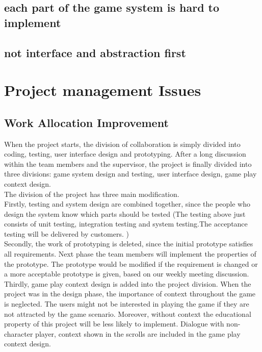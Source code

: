 \documentclass[12pt, a4paper]{report}
\begin{document}
		\subsection {each part of the game system is hard to implement}
		\subsection {not interface and abstraction first}

	\section{Project management Issues}
		\subsection{Work Allocation Improvement}
		When the project starts, the division of collaboration is simply divided into coding, testing, user interface design and prototyping. After a long discussion within the team members and the supervisor, the project is finally divided into three divisions: game system design and testing, user interface design, game play context design. \\


		The division of the project has three main modification.\\

		Firstly, testing and system design are combined together, since the people who design the system know which parts should be tested (The testing above just consists of unit testing, integration testing and system testing.The acceptance testing will be delivered by customers. )\\

		Secondly, the work of prototyping is deleted, since the initial prototype satisfies all requirements. Next phase the team members will implement the properties of the prototype. The prototype would be modified if the requirement is changed or a more acceptable prototype is
		given, based on our weekly meeting discussion.\\

		Thirdly, game play context design is added into the project division. When the project was in the design phase, the importance of context throughout the game is neglected. The users might not be interested in playing the game if they are not attracted by the game scenario. Moreover, without context the educational property of this project will be less likely to implement. Dialogue with non-character player, context shown in the scrolls are included in the game play context design.\\ 
\end{document}
